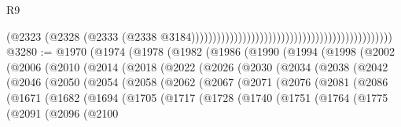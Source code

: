 \begin{lexlean}{R9}
\begin{coremodule}
{{{{{{{{{{{{{{{{{{{{{{{{{{{{{{{{{{{{{{{{{{{{{{{{{{{{{{{{{{{{{{{{{{{{{{{{{{{{{{{{{{{{{{{{{{{{{{{{{{{{{{{{{{{{                                                                                          (@2323
                                                                                            (@2328
                                                                                              (@2333
                                                                                                (@2338
                                                                                                  @3184)))))))))))))))))))))))))))))))))))))))))))))))
@3280 := @1970
    (@1974
      (@1978
        (@1982
          (@1986
            (@1990
              (@1994
                (@1998
                  (@2002
                    (@2006
                      (@2010
                        (@2014
                          (@2018
                            (@2022
                              (@2026
                                (@2030
                                  (@2034
                                    (@2038
                                      (@2042
                                        (@2046
                                          (@2050
                                            (@2054
                                              (@2058
                                                (@2062
                                                  (@2067
                                                    (@2071
                                                      (@2076
                                                        (@2081
                                                          (@2086
                                                            (@1671
                                                              (@1682
                                                                (@1694
                                                                  (@1705
                                                                    (@1717
                                                                      (@1728
                                                                        (@1740
                                                                          (@1751
                                                                            (@1764
                                                                              (@1775
                                                                                (@2091
                                                                                  (@2096
                                                                                    (@2100
}}}}}}}}}}}}}}}}}}}}}}}}}}}}}}}}}}}}}}}}}}}}}}}}}}}}}}}}}}}}}}}}}}}}}}}}}}}}}}}}}}}}}}}}}}}}}}}}}}}}}}}}}}}}
\end{coremodule}
\end{lexlean}
